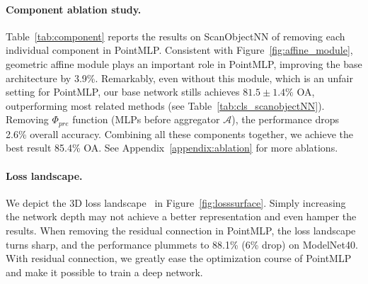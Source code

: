 \paragraph{Component ablation study.} Table~\ref{tab:component} reports the results on ScanObjectNN of removing each individual component in PointMLP. Consistent with Figure~\ref{fig:affine_module}, geometric affine module plays an important role in PointMLP,
improving the base architecture by 3.9\%. Remarkably, even without this module, which is an unfair setting for PointMLP,  our base network stills achieves $81.5\pm1.4\%$ OA, outperforming most related methods (see Table~\ref{tab:cls_scanobjectNN}).
Removing $\Phi_{pre}$ function (MLPs before aggregator $\mathcal{A}$), the performance drops 2.6\% overall accuracy. Combining all these components together, we achieve the best result 85.4\% OA. See Appendix~\ref{appendix:ablation} for more ablations.

\paragraph{Loss landscape.} We depict the 3D loss landscape~\citep{li2018visualizing} in Figure~\ref{fig:losssurface}. Simply increasing the network depth may not achieve a better representation and even hamper the results. When removing the residual connection in PointMLP, the loss landscape turns sharp, and the performance plummets to 88.1\% (6\% drop) on ModelNet40. With residual connection, we greatly ease the optimization course of PointMLP and make it possible to train a deep network.

         
         

